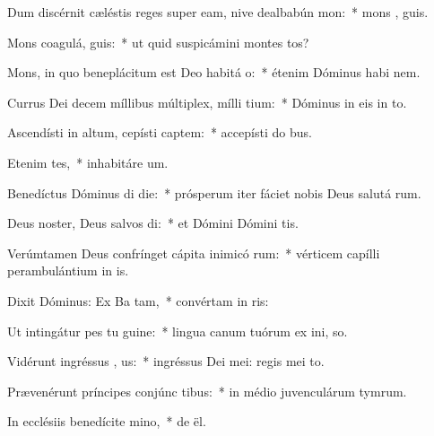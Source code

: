 \item Dum discérnit cæléstis reges super eam, nive dealbabún  mon:~* mons ,  guis.
\item Mons coagulá,  guis:~* ut quid suspicámini montes tos?
\item Mons, in quo beneplácitum est Deo habitá  o:~* étenim Dóminus habi  nem.
\item Currus Dei decem míllibus múltiplex, mílli tium:~* Dóminus in eis in   to.
\item Ascendísti in altum, cepísti captem:~* accepísti do  bus.
\item Etenim  tes,~* inhabitáre  um.
\item Benedíctus Dóminus di die:~* prósperum iter fáciet nobis Deus salutá rum.
\item Deus noster, Deus salvos di:~* et Dómini Dómini  tis.
\item Verúmtamen Deus confrínget cápita inimicó rum:~* vérticem capílli perambulántium in  is.
\item Dixit Dóminus: Ex Ba tam,~* convértam in  ris:
\item Ut intingátur pes tu  guine:~* lingua canum tuórum ex ini,  so.
\item Vidérunt ingréssus , us:~* ingréssus Dei mei: regis mei    to.
\item Prævenérunt príncipes conjúnc tibus:~* in médio juvenculárum tymrum.
\item In ecclésiis benedícite  mino,~* de  ël.

